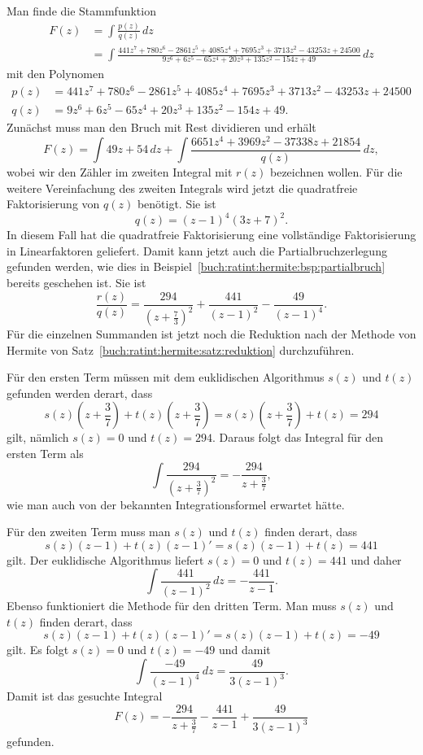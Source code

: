 \begin{beispiel}
Man finde die Stammfunktion
\begin{align*}
F(z)
&=
\int
\frac{p(z)}{q(z)}\,dz
\\
&=
\int
\frac{
441z^7 + 780z^6 - 2861z^5 + 4085z^4 + 7695z^3 + 3713z^2 - 43253z + 24500
}{
9z^6 + 6z^5 - 65z^4 + 20z^3 + 135z^2 - 154z + 49
}
\,dz
\end{align*}
mit den Polynomen
\begin{align*}
p(z)
&=
441z^7 + 780z^6 - 2861z^5 + 4085z^4 + 7695z^3 + 3713z^2 - 43253z + 24500
\\
q(z)
&=
9z^6 + 6z^5 - 65z^4 + 20z^3 + 135z^2 - 154z + 49.
\end{align*}
Zunächst muss man den Bruch mit Rest dividieren und erhält
\[
F(z)
=
\int 49z + 54\,dz
+
\int
\frac{6651z^4 + 3969z^2 - 37338z + 21854}{q(z)}\,dz,
\]
wobei wir den Zähler im zweiten Integral mit $r(z)$ bezeichnen wollen.
Für die weitere Vereinfachung des zweiten Integrals wird jetzt die
quadratfreie Faktorisierung von $q(z)$ benötigt.
Sie ist
\[
q(z)
=
(z-1)^4(3z+7)^2.
\]
In diesem Fall hat die quadratfreie Faktorisierung eine vollständige
Faktorisierung in Linearfaktoren geliefert.
Damit kann jetzt auch die Partialbruchzerlegung gefunden werden,
wie dies in Beispiel~\ref{buch:ratint:hermite:bsp:partialbruch}
bereits geschehen ist.
Sie ist
\begin{equation}
\frac{r(z)}{q(z)}
=
\frac{294}{(z+\frac{7}{3})^2}
+
\frac{441}{(z-1)^2}
-
\frac{49}{(z-1)^4}.
\label{buch:ratint:hermite:bps:hermite:pf}
\end{equation}
Für die einzelnen Summanden ist jetzt noch die Reduktion nach der Methode
von Hermite von Satz~\ref{buch:ratint:hermite:satz:reduktion} durchzuführen.

Für den ersten Term müssen mit dem euklidischen Algorithmus
$s(z)$ und $t(z)$ gefunden werden derart, dass
\[
s(z)(z+{\textstyle\frac{3}{7}}) + t(z)(z+{\textstyle\frac{3}{7}})
=
s(z)(z+{\textstyle\frac{3}{7}}) + t(z) = 294
\]
gilt, nämlich $s(z)=0$ und $t(z)=294$.
Daraus folgt das Integral für den ersten Term als
\[
\int \frac{294}{(z+\frac37)^2}
=
-\frac{294}{z+{\textstyle\frac37}},
\]
wie man auch von der bekannten Integrationsformel erwartet hätte.

Für den zweiten Term muss man $s(z)$ und $t(z)$ finden derart, dass
\[
s(z)(z-1) + t(z)(z-1)' = s(z)(z-1) + t(z) = 441
\]
gilt.
Der euklidische Algorithmus liefert $s(z)=0$ und $t(z)=441$ und daher
\[
\int \frac{441}{(z-1)^2}\,dz
=
-
\frac{441}{z-1}.
\]
Ebenso funktioniert die Methode für den dritten Term.
Man muss $s(z)$ und $t(z)$ finden derart, dass
\[
s(z)(z-1) + t(z)(z-1)' = s(z)(z-1) + t(z) = -49
\]
gilt.
Es folgt $s(z)=0$ und $t(z)=-49$ und damit 
\[
\int \frac{-49}{(z-1)^4} \,dz
=
\frac{49}{3(z-1)^3}.
\]
Damit ist das gesuchte Integral
\[
F(z)
=
-
\frac{294}{z+\frac{3}{7}}
-
\frac{441}{z-1}
+
\frac{49}{3(z-1)^3}
\]
gefunden.
\end{beispiel}

